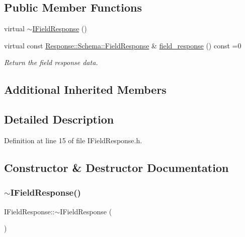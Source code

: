 \subsection*{Public Member Functions}
\begin{DoxyCompactItemize}
\item 
virtual \hyperlink{class_wire_cell_1_1_i_field_response_a0118eb8879295ab7d704fad37ae2ddc9}{$\sim$\+I\+Field\+Response} ()
\item 
virtual const \hyperlink{struct_wire_cell_1_1_response_1_1_schema_1_1_field_response}{Response\+::\+Schema\+::\+Field\+Response} \& \hyperlink{class_wire_cell_1_1_i_field_response_a367f57c6ea973d7aa51022f6e3640256}{field\+\_\+response} () const =0
\begin{DoxyCompactList}\small\item\em Return the field response data. \end{DoxyCompactList}\end{DoxyCompactItemize}
\subsection*{Additional Inherited Members}


\subsection{Detailed Description}


Definition at line 15 of file I\+Field\+Response.\+h.



\subsection{Constructor \& Destructor Documentation}
\mbox{\label{class_wire_cell_1_1_i_field_response_a0118eb8879295ab7d704fad37ae2ddc9}} 
\subsubsection{\texorpdfstring{$\sim$\+I\+Field\+Response()}{~IFieldResponse()}}
{\footnotesize\ttfamily I\+Field\+Response\+::$\sim$\+I\+Field\+Response (\begin{DoxyParamCaption}{ }\end{DoxyParamCaption})\hspace{0.3cm}{\ttfamily [virtual]}}



